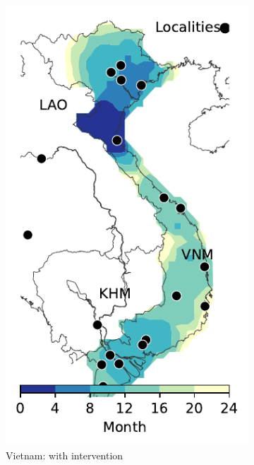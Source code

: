 \documentclass[10pt]{article}
\theoremstyle{definition}
\begin{document}
\begin{figure}[!ht]
\begin{subfigure}[b]{.28\textwidth}
\includegraphics[width=\textwidth]{../cellular_automata/results/contour/VN_model-B_precip1-out-100_m1_l3.pdf}
\caption{Vietnam: with intervention\label{fig:vnmBContourInt}}
\end{subfigure}
\begin{subfigure}[b]{.32\textwidth}

\end{subfigure}
\end{figure}
\end{document}

